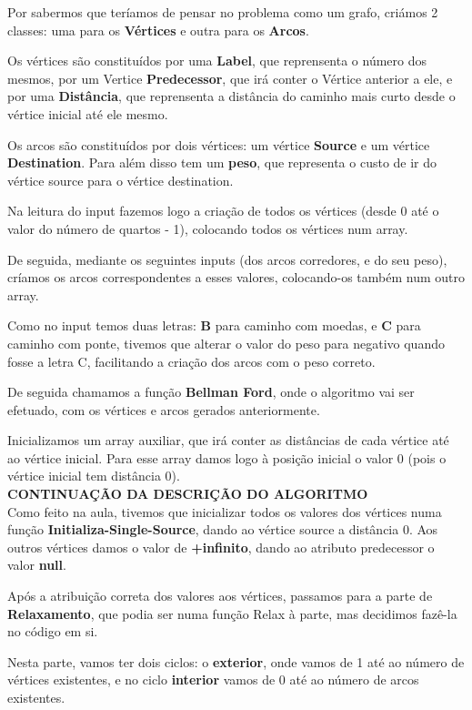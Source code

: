 \documentclass[11pt]{article}   %
\begin{document}
Por sabermos que teríamos de pensar no problema como um grafo, criámos 2 classes: uma para os \textbf{Vértices} e outra para os \textbf{Arcos}.

Os vértices são constituídos por uma \textbf{Label}, que reprensenta o número dos mesmos, por um Vertice \textbf{Predecessor}, que irá conter o Vértice anterior a ele, e por uma \textbf{Distância}, que reprensenta a distância do caminho mais curto desde o vértice inicial até ele mesmo.

Os arcos são constituídos por dois vértices: um vértice \textbf{Source} e um vértice \textbf{Destination}. Para além disso tem um \textbf{peso}, que representa o custo de ir do vértice source para o vértice destination.

Na leitura do input fazemos logo a criação de todos os vértices (desde 0 até o valor do número de quartos - 1), colocando todos os vértices num array.

De seguida, mediante os seguintes inputs (dos arcos corredores, e do seu peso), críamos os arcos correspondentes a esses valores, colocando-os também num outro array.

Como no input temos duas letras: \textbf{B} para caminho com moedas, e \textbf{C} para caminho com ponte, tivemos que alterar o valor do peso para negativo quando fosse a letra C, facilitando a criação dos arcos com o peso correto.

De seguida chamamos a função \textbf{Bellman Ford}, onde o algoritmo vai ser efetuado, com os vértices e arcos gerados anteriormente.

Inicializamos um array auxiliar, que irá conter as distâncias de cada vértice até ao vértice inicial.
Para esse array damos logo à posição inicial o valor 0 (pois o vértice inicial tem distância 0).\\[0.5cm]

\large\textbf{CONTINUAÇÃO DA DESCRIÇÃO DO ALGORITMO}\\

Como feito na aula, tivemos que inicializar todos os valores dos vértices numa função \textbf{Initializa-Single-Source}, dando ao vértice source a distância 0. Aos outros vértices damos o valor de \textbf{+infinito}, dando ao atributo predecessor o valor \textbf{null}.

Após a atribuição correta dos valores aos vértices, passamos para a parte de \textbf{Relaxamento}, que podia ser numa função Relax à parte, mas decidimos fazê-la no código em si.

Nesta parte, vamos ter dois ciclos: o \textbf{exterior}, onde vamos de 1 até ao número de vértices existentes, e no ciclo \textbf{interior} vamos de 0 até ao número de arcos existentes.
\end{document}
